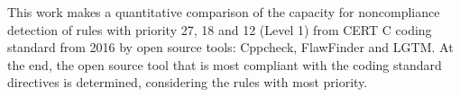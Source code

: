 This work makes a quantitative comparison of the capacity for noncompliance detection of rules with priority 27, 18 and 12 (Level 1) from CERT C coding standard from 2016 by open source tools: Cppcheck, FlawFinder and LGTM. At the end, the open source tool that is most compliant with the coding standard directives is determined, considering the rules with most priority.
